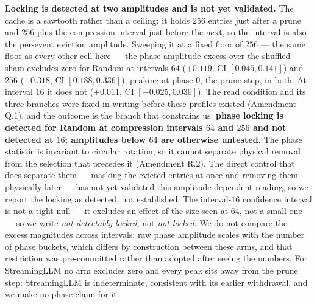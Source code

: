 \documentclass{article}
\begin{document}
\textbf{Locking is detected at two amplitudes and is not yet validated.} The cache is a sawtooth rather than a ceiling:
it holds $256$ entries just after a prune and $256$ plus the compression
interval just before the next, so the interval is also the per-event eviction
amplitude. Sweeping it at a fixed floor of $256$ --- the same floor as every
other cell here --- the phase-amplitude excess over the shuffled sham excludes
zero for Random at intervals $64$ ($+0.119$, CI $[0.045, 0.141]$) and $256$
($+0.318$, CI $[0.188, 0.336]$), peaking at phase $0$, the prune step, in both.
At interval $16$ it does not ($+0.011$, CI $[-0.025, 0.030]$). The read condition
and its three branches were fixed in writing before these profiles existed
(Amendment Q.1), and the outcome is the branch that constrains us:
\textbf{phase locking is detected for Random at compression intervals $64$ and
$256$ and not detected at $16$; amplitudes below $64$ are otherwise untested.}
The phase statistic is invariant to circular rotation, so it cannot separate
physical removal from the selection that precedes it (Amendment R.2). The
direct control that does separate them --- masking the evicted entries at once
and removing them physically later --- has not yet validated this
amplitude-dependent reading, so we report the locking as detected, not
established. The interval-$16$ confidence interval is not a tight null --- it excludes an effect of the size seen at $64$, not a small
one --- so we write \emph{not detectably locked}, not \emph{not locked}. We do
not compare the excess magnitudes across intervals: raw phase amplitude scales
with the number of phase buckets, which differs by construction between these
arms, and that restriction was pre-committed rather than adopted after seeing
the numbers. For StreamingLLM no arm excludes zero and every peak sits away from
the prune step: StreamingLLM is indeterminate, consistent with its earlier
withdrawal, and we make no phase claim for it.
\end{document}
